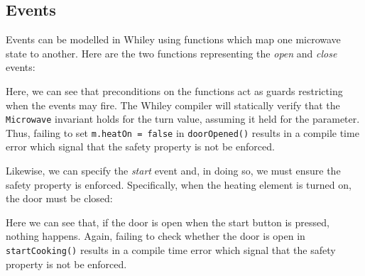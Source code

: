 \subsection{Events}

Events can be modelled in Whiley using functions which map one microwave state to another.  Here are the two functions representing the {\em open} and {\em close} events:



Here, we can see that preconditions on the functions act as guards restricting when the events may fire.  The Whiley compiler will statically verify that the \lstinline{Microwave} invariant holds for the turn value, assuming it held for the parameter.  Thus, failing to set \lstinline{m.heatOn = false} in \lstinline{doorOpened()} results in a compile time error which signal that the safety property is not be enforced.

Likewise, we can specify the {\em start} event and, in doing so, we must ensure the safety property is enforced.  Specifically, when the heating element is turned on, the door must be closed:



Here we can see that, if the door is open when the start button is pressed, nothing happens.  Again, failing to check whether the door is open in \lstinline{startCooking()} results in a compile time error which signal that the safety property is not be enforced.
